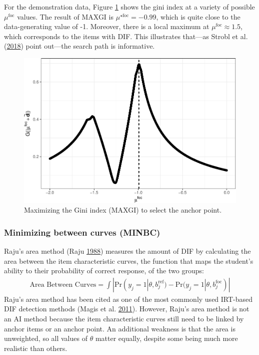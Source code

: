 \documentclass[
  11pt,
]{article}
\begin{document}
For the demonstration data, Figure \ref{fig:ginipath} shows the gini index at a variety of possible \(\mu^\text{foc}\) values. The result of MAXGI is \(\mu^{\star\text{foc}} = -0.99\), which is quite close to the data-generating value of -1. Moreover, there is a local maximum at \(\mu^{\text{foc}} \approx 1.5\), which corresponds to the items with DIF. This illustrates that---as Strobl et al. (\protect\hyperlink{ref-strobl2018anchor}{2018}) point out---the search path is informative.

\begin{figure}[H]

{\centering \includegraphics[width=0.7\linewidth]{paper_files/figure-latex/ginipath-1} 

}

\caption{Maximizing the Gini index (MAXGI) to select the anchor point.}\label{fig:ginipath}
\end{figure}

\hypertarget{minimizing-between-curves-minbc}{%
\subsubsection{Minimizing between curves (MINBC)}\label{minimizing-between-curves-minbc}}

Raju's area method (Raju \protect\hyperlink{ref-raju1988area}{1988}) measures the amount of DIF by calculating the area between the item characteristic curves, the function that maps the student's ability to their probability of correct response, of the two groups:
\begin{align}
\text{Area Between Curves} = \int |\text{Pr}(y_j = 1| \theta, b_j^{\text{ref}}) - \text{Pr}(y_j = 1| \theta, b_j^{\text{foc}})|
\end{align}
Raju's area method has been cited as one of the most commonly used IRT-based DIF detection methods (Magis et al. \protect\hyperlink{ref-magis2011generalized}{2011}). However, Raju's area method is not an AI method because the item characteristic curves still need to be linked by anchor items or an anchor point. An additional weakness is that the area is unweighted, so all values of \(\theta\) matter equally, despite some being much more realistic than others.
\end{document}
